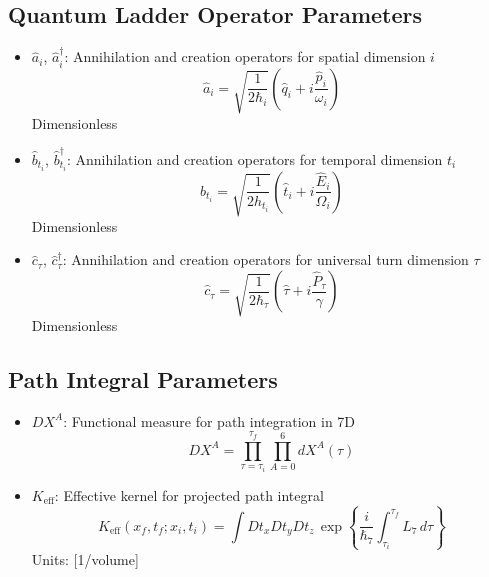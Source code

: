 \documentclass{article}
\begin{document}
\subsection{Quantum Ladder Operator Parameters}

\begin{itemize}
\item $\hat{a}_i$, $\hat{a}_i^\dagger$: Annihilation and creation operators for spatial dimension $i$
    \begin{equation}
    \hat{a}_i = \sqrt{\frac{1}{2\hbar_i}}(\hat{q}_i + i\frac{\hat{p}_i}{\omega_i})
    \end{equation}
    Dimensionless
    
\item $\hat{b}_{t_i}$, $\hat{b}_{t_i}^\dagger$: Annihilation and creation operators for temporal dimension $t_i$
    \begin{equation}
    \hat{b}_{t_i} = \sqrt{\frac{1}{2h_{t_i}}}(\hat{t}_i + i\frac{\hat{E}_i}{\Omega_i})
    \end{equation}
    Dimensionless
    
\item $\hat{c}_\tau$, $\hat{c}_\tau^\dagger$: Annihilation and creation operators for universal turn dimension $\tau$
    \begin{equation}
    \hat{c}_\tau = \sqrt{\frac{1}{2\hbar_\tau}}(\hat{\tau} + i\frac{\hat{P}_\tau}{\gamma})
    \end{equation}
    Dimensionless
\end{itemize}

\subsection{Path Integral Parameters}

\begin{itemize}
\item $DX^A$: Functional measure for path integration in 7D
    \begin{equation}
    DX^A = \prod_{\tau=\tau_i}^{\tau_f} \prod_{A=0}^6 dX^A(\tau)
    \end{equation}
    
\item $K_{\text{eff}}$: Effective kernel for projected path integral
    \begin{equation}
    K_{\text{eff}}(x_f,t_f;x_i,t_i) = \int Dt_x Dt_y Dt_z \, \exp\left\{\frac{i}{\hbar_7} \int_{\tau_i}^{\tau_f} L_7 \, d\tau\right\}
    \end{equation}
    Units: [1/volume]
\end{itemize}
\end{document}
